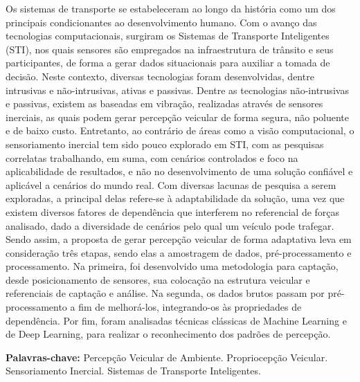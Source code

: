 

\begin{resumo}[Resumo]
    Os sistemas de transporte se estabeleceram ao longo da história como um dos principais condicionantes ao desenvolvimento humano. Com o avanço das tecnologias computacionais, surgiram os Sistemas de Transporte Inteligentes (STI), nos quais sensores são empregados na infraestrutura de trânsito e seus participantes, de forma a gerar dados situacionais para auxiliar a tomada de decisão. Neste contexto, diversas tecnologias foram desenvolvidas, dentre intrusivas e não-intrusivas, ativas e passivas. Dentre as tecnologias não-intrusivas e passivas, existem as baseadas em vibração, realizadas através de sensores inerciais, as quais podem gerar percepção veicular de forma segura, não poluente e de baixo custo. Entretanto, ao contrário de áreas como a visão computacional, o sensoriamento inercial tem sido pouco explorado em STI, com as pesquisas correlatas trabalhando, em suma, com cenários controlados e foco na aplicabilidade de resultados, e não no desenvolvimento de uma solução confiável e aplicável a cenários do mundo real. Com diversas lacunas de pesquisa a serem exploradas, a principal delas refere-se à adaptabilidade da solução, uma vez que existem diversos fatores de dependência que interferem no referencial de forças analisado, dado a diversidade de cenários pelo qual um veículo pode trafegar. Sendo assim, a proposta de gerar percepção veicular de forma adaptativa leva em consideração três etapas, sendo elas a amostragem de dados, pré-processamento e processamento. Na primeira, foi desenvolvido uma metodologia para captação, desde posicionamento de sensores, sua colocação na estrutura veicular e referenciais de captação e análise. Na segunda, os dados brutos passam por pré-processamento a fim de melhorá-los, integrando-os às propriedades de dependência. Por fim, foram analisadas técnicas clássicas de Machine Learning e de Deep Learning, para realizar o reconhecimento dos padrões de percepção.
    
  \vspace{\baselineskip} 
  \textbf{Palavras-chave:} 
  Percepção Veicular de Ambiente. 
  Propriocepção Veicular. 
  Sensoriamento Inercial. 
  Sistemas de Transporte Inteligentes.
  
\end{resumo}
